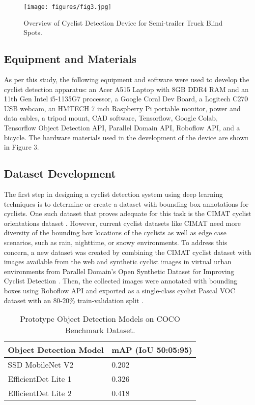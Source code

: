 \documentclass{article}
\begin{document}
\begin{figure}[b]
\centering
\texttt{[image: figures/fig3.jpg]}
\caption{Overview of Cyclist Detection Device for Semi-trailer Truck Blind Spots.}
\label{fig:fig3}
\end{figure}

\subsection{Equipment and Materials}
As per this study, the following equipment and software were used to develop the cyclist detection apparatus: an Acer A515 Laptop with 8GB DDR4 RAM and an 11th Gen Intel i5-1135G7 processor, a Google Coral Dev Board, a Logitech C270 USB webcam, an HMTECH 7 inch Raspberry Pi portable monitor, power and data cables, a tripod mount, CAD software, Tensorflow, Google Colab, Tensorflow Object Detection API, Parallel Domain API, Roboflow API, and a bicycle. The hardware materials used in the development of the device are shown in Figure 3. 

\subsection{Dataset Development}
The first step in designing a cyclist detection system using deep learning techniques is to determine or create a dataset with bounding box annotations for cyclists. One such dataset that proves adequate for this task is the CIMAT cyclist orientations dataset \cite{garcia-venegas_safety_2021}. However, current cyclist datasets like CIMAT need more diversity of the bounding box locations of the cyclists as well as edge case scenarios, such as rain, nighttime, or snowy environments. To address this concern, a new dataset was created by combining the CIMAT cyclist dataset with images available from the web and synthetic cyclist images in virtual urban environments from Parallel Domain’s Open Synthetic Dataset for Improving Cyclist Detection \cite{thomas_open_2021}. Then, the collected images were annotated with bounding boxes using Roboflow API and exported as a single-class cyclist Pascal VOC dataset with an 80-20\% train-validation split \cite{dwyer_roboflow_2022} \cite{everingham_visual_2012}. 

\begin{table}[b]
 \caption{Prototype Object Detection Models on COCO Benchmark Dataset.}
  \centering
  \begin{tabular}{ll}
    \cmidrule(r){1-2}
    Object Detection Model & mAP (IoU 50:05:95) \\
    \midrule
    SSD MobileNet V2 & 0.202  \\
    EfficientDet Lite 1  & 0.326  \\
    EfficientDet Lite 2 & 0.418  \\
    \bottomrule
  \end{tabular}
  \label{tab:table1}
\end{table}
\end{document}
